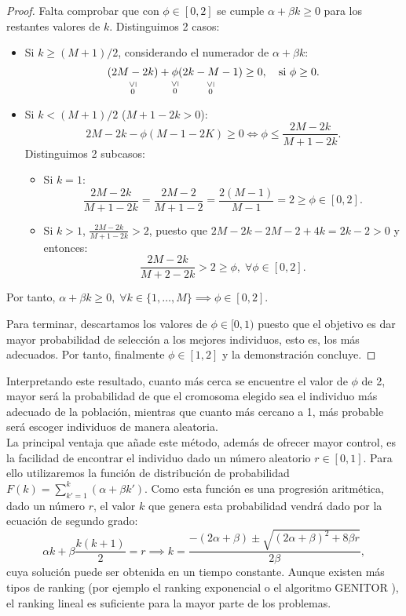 \begin{proposition}
\begin{proof}
        Falta comprobar que con $\phi\in[0,2]$ se cumple $\alpha+\beta k\geq0$ para los restantes valores de $k$. Distinguimos 2 casos:

        \begin{itemize}
            \item Si $k\geq(M+1)/2$, considerando el numerador de $\alpha+\beta k$:
            \[
            \underset{\overset{\scriptsize \rotatebox[origin=c]{90}{$\leq$}}{0}}{(2M - 2k)} 
            + \underset{\overset{\scriptsize \rotatebox[origin=c]{90}{$\leq$}}{0}}{\phi}\underset{\overset{\scriptsize \rotatebox[origin=c]{90}{$\leq$}}{0}}{(2k - M - 1)} 
            \geq 0, \quad \text{si } \phi \geq 0.
            \]
            \item Si $k<(M+1)/2$ ($M+1-2k>0$):
            $$2M-2k-\phi(M-1-2K)\geq 0 \iff \phi\leq\frac{2M-2k}{M+1-2k}.$$
            Distinguimos 2 subcasos:
            \begin{itemize}
                \item Si $k=1$: $$\frac{2M-2k}{M+1-2k}=\frac{2M-2}{M+1-2}=\frac{2(M-1)}{M-1}=2\geq\phi\in[0,2].$$
                \item Si $k>1$, $\frac{2M-2k}{M+1-2k}>2$, puesto que $2M-2k-2M-2+4k=2k-2>0$ y entonces:
                $$\frac{2M-2k}{M+2-2k}>2\geq\phi,\;\forall\phi\in[0,2].$$
            \end{itemize}
        \end{itemize}
        
        Por tanto, $\alpha+\beta k \geq 0,\;\forall k\in\{1,\ldots,M\}\implies \phi\in[0,2]$.
        
        Para terminar, descartamos los valores de $\phi\in[0,1)$ puesto que el objetivo es dar mayor probabilidad de selección a los mejores individuos, esto es, los más adecuados. Por tanto, finalmente $\phi\in[1,2]$ y la demonstración concluye.
    \end{proof}
\end{proposition}

Interpretando este resultado, cuanto más cerca se encuentre el valor de $\phi$ de 2, mayor será la probabilidad de que el cromosoma elegido sea el individuo más adecuado de la población, mientras que cuanto más cercano a 1, más probable será escoger individuos de manera aleatoria.\\

La principal ventaja que añade este método, además de ofrecer mayor control, es la facilidad de encontrar el individuo dado un número aleatorio $r\in[0,1]$. Para ello utilizaremos la función de distribución de probabilidad $F(k)=\sum_{k'=1}^k(\alpha+\beta k')$. Como esta función es una progresión aritmética, dado un número $r$, el valor $k$ que genera esta probabilidad vendrá dado por la ecuación de segundo grado:
$$\alpha k+\beta\frac{k(k+1)}{2}=r\implies k = \frac{-(2\alpha+\beta)\pm \sqrt{(2\alpha+\beta)^2+8\beta r}}{2\beta},$$
cuya solución puede ser obtenida en un tiempo constante. Aunque existen más tipos de ranking (por ejemplo el ranking exponencial \cite{exponential-ranking} o el algoritmo GENITOR \cite{genitor}), el ranking lineal es suficiente para la mayor parte de los problemas.
